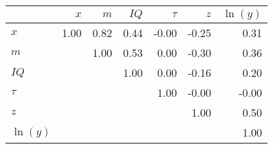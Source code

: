 \begin{tabular}{lrrrrrr}
\hline
 & $x$  & $m$  & $IQ$  & $\tau$  & $z$  & $\ln(y)$  \\ 
\hline
$x$ & 1.00  & 0.82  & 0.44  & -0.00  & -0.25  & 0.31  \\ 
$m$ &   & 1.00  & 0.53  & 0.00  & -0.30  & 0.36  \\ 
$IQ$ &   &   & 1.00  & 0.00  & -0.16  & 0.20  \\ 
$\tau$ &   &   &   & 1.00  & -0.00  & -0.00  \\ 
$z$ &   &   &   &   & 1.00  & 0.50  \\ 
$\ln(y)$ &   &   &   &   &   & 1.00  \\ 
\hline
\end{tabular}%
